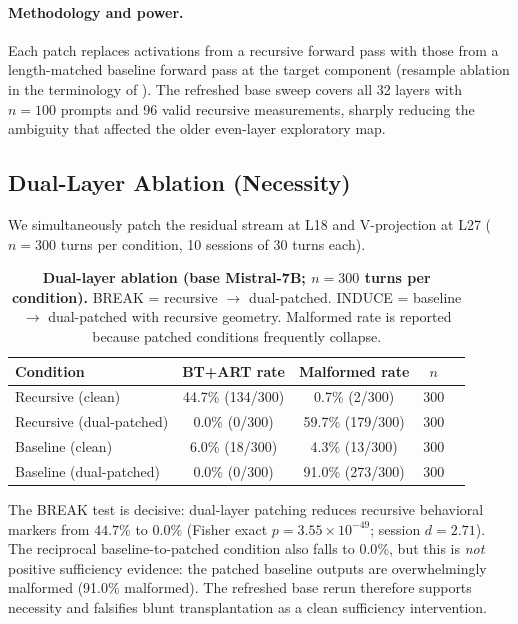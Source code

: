 \documentclass{article}
\newcommand{\dcohen}{d}
\begin{document}
\paragraph{Methodology and power.}
Each patch replaces activations from a recursive forward pass with those from a
length-matched baseline forward pass at the target component (resample ablation in the
terminology of \citet{heimersheim2024activation}).
The refreshed base sweep covers all 32 layers with $n = 100$ prompts and 96 valid recursive
measurements, sharply reducing the ambiguity that affected the older even-layer exploratory map.

\subsection{Dual-Layer Ablation (Necessity)}
\label{sec:necessity}

We simultaneously patch the residual stream at L18 and V-projection at L27
($n = 300$ turns per condition, 10 sessions of 30 turns each).

\begin{table}[ht]
\centering
\caption{\textbf{Dual-layer ablation (base Mistral-7B; $n = 300$ turns per condition).}
         BREAK = recursive $\to$ dual-patched.
         INDUCE = baseline $\to$ dual-patched with recursive geometry.
         Malformed rate is reported because patched conditions frequently collapse.}
\label{tab:duallayer}
\smallskip
\begin{tabular}{lcccc}
\toprule
\textbf{Condition} & \textbf{BT+ART rate} & \textbf{Malformed rate} & \textbf{$n$} \\
\midrule
Recursive (clean)       & 44.7\% (134/300) & 0.7\% (2/300) & 300 \\
Recursive (dual-patched) & 0.0\% (0/300) & 59.7\% (179/300) & 300 \\
\midrule
Baseline (clean)        & 6.0\% (18/300)   & 4.3\% (13/300) & 300 \\
Baseline (dual-patched)  & 0.0\% (0/300)    & 91.0\% (273/300) & 300 \\
\bottomrule
\end{tabular}
\end{table}

The BREAK test is decisive: dual-layer patching reduces recursive behavioral
markers from $44.7\%$ to $0.0\%$ (Fisher exact $p = 3.55 \times 10^{-49}$;
session $\dcohen = 2.71$).
The reciprocal baseline-to-patched condition also falls to $0.0\%$, but this is
\emph{not} positive sufficiency evidence: the patched baseline outputs are overwhelmingly malformed
(91.0\% malformed).
The refreshed base rerun therefore supports necessity and falsifies blunt transplantation as a clean
sufficiency intervention.
\end{document}
